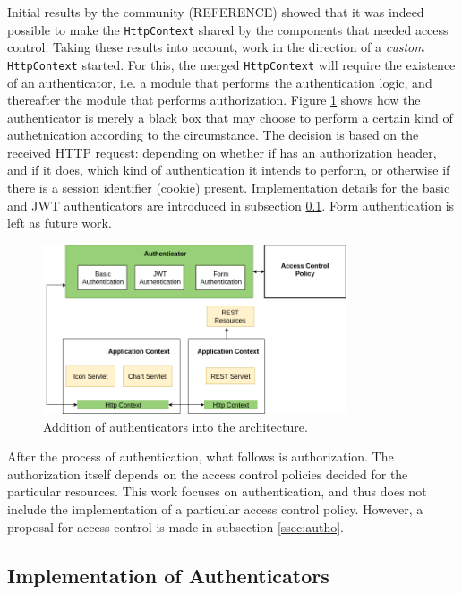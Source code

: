 \documentclass[12pt]{article}
\begin{document}
Initial results by the community (REFERENCE) showed that it was indeed possible to make the \texttt{HttpContext} shared by the components that needed access control. Taking these results into account, work in the direction of a \emph{custom} \texttt{HttpContext} started. For this, the merged \texttt{HttpContext} will require the existence of an authenticator, i.e. a module that performs the authentication logic, and thereafter the module that performs authorization. Figure \ref{fig:esh_arch_authenticator} shows how the authenticator is merely a black box that may choose to perform a certain kind of authetnication according to the circumstance. The decision is based on the received HTTP request: depending on whether if has an authorization header, and if it does, which kind of authentication it intends to perform, or otherwise if there is a session identifier (cookie) present. Implementation details for the basic and JWT authenticators are introduced in subsection \ref{ssec:impl}. Form authentication is left as future work. 

\begin{figure} [ht] 
\begin{center}
\includegraphics[width=0.8\textwidth]{esh_arch_authenticator}
\caption{Addition of authenticators into the architecture.}
\label{fig:esh_arch_authenticator}
\end{center}
\end{figure}

After the process of authentication, what follows is authorization. The authorization itself depends on the access control policies decided for the particular resources. This work focuses on authentication, and thus does not include the implementation of a particular access control policy. However, a proposal for access control is made in subsection \ref{ssec:autho}.

\subsection{Implementation of Authenticators}
\label{ssec:impl}
\end{document}
